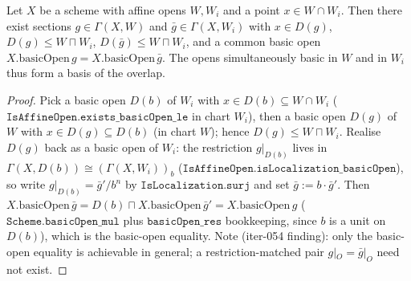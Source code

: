 \begin{lemma}

  \label{lem:gf_common_basicOpen_basis}
  Let \(X\) be a scheme with affine opens \(W, W_i\) and a point \(x \in W \cap W_i\). Then there
  exist sections \(g \in \Gamma(X, W)\) and \(\bar g \in \Gamma(X, W_i)\) with
  \(x \in D(g)\), \(D(g) \le W \sqcap W_i\), \(D(\bar g) \le W \sqcap W_i\), and a common basic
  open \(X.\mathrm{basicOpen}\,g = X.\mathrm{basicOpen}\,\bar g\). The opens simultaneously basic
  in \(W\) and in \(W_i\) thus form a basis of the overlap.
\end{lemma}

\begin{proof}
  \leanok
  Pick a basic open \(D(b)\) of \(W_i\) with \(x \in D(b) \subseteq W \cap W_i\)
  (\(\texttt{IsAffineOpen.exists\_basicOpen\_le}\) in chart \(W_i\)), then a basic open \(D(g)\) of
  \(W\) with \(x \in D(g) \subseteq D(b)\) (in chart \(W\)); hence \(D(g) \le W \sqcap W_i\).
  Realise \(D(g)\) back as a basic open of \(W_i\): the restriction \(g|_{D(b)}\) lives in
  \(\Gamma(X, D(b)) \cong (\Gamma(X, W_i))_b\) (\(\texttt{IsAffineOpen.isLocalization\_basicOpen}\)),
  so write \(g|_{D(b)} = \bar g'/b^{n}\) by \(\texttt{IsLocalization.surj}\) and set
  \(\bar g := b \cdot \bar g'\). Then \(X.\mathrm{basicOpen}\,\bar g = D(b) \sqcap X.\mathrm{basicOpen}\,\bar g' = X.\mathrm{basicOpen}\,g\)
  (\(\texttt{Scheme.basicOpen\_mul}\) plus \(\texttt{basicOpen\_res}\) bookkeeping, since \(b\) is a
  unit on \(D(b)\)), which is the basic-open equality. Note (iter-054 finding): only the basic-open
  equality is achievable in general; a restriction-matched pair \(g|_O = \bar g|_O\) need not exist.
\end{proof}

